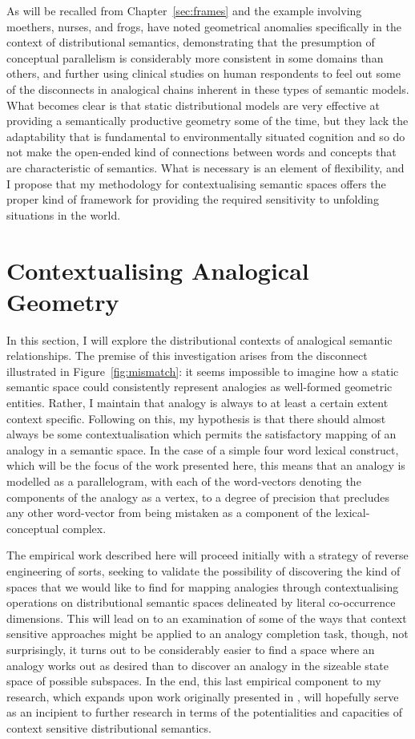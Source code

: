 As will be recalled from Chapter~\ref{sec:frames} and the example involving moethers, nurses, and frogs, \cite{ChenEA2017} have noted geometrical anomalies specifically in the context of distributional semantics, demonstrating that the presumption of conceptual parallelism is considerably more consistent in some domains than others, and further using clinical studies on human respondents to feel out some of the disconnects in analogical chains inherent in these types of semantic models.  What becomes clear is that static distributional models are very effective at providing a semantically productive geometry some of the time, but they lack the adaptability that is fundamental to environmentally situated cognition and so do not make the open-ended kind of connections between words and concepts that are characteristic of semantics.  What is necessary is an element of flexibility, and I propose that my methodology for contextualising semantic spaces offers the proper kind of framework for providing the required sensitivity to unfolding situations in the world.

\section{Contextualising Analogical Geometry} \label{sec:anatext}
In this section, I will explore the distributional contexts of analogical semantic relationships.  The premise of this investigation arises from the disconnect illustrated in Figure~\ref{fig:mismatch}: it seems impossible to imagine how a static semantic space could consistently represent analogies as well-formed geometric entities.  Rather, I maintain that analogy is always to at least a certain extent context specific.  Following on this, my hypothesis is that there should almost always be some contextualisation which permits the satisfactory mapping of an analogy in a semantic space.  In the case of a simple four word lexical construct, which will be the focus of the work presented here, this means that an analogy is modelled as a parallelogram, with each of the word-vectors denoting the components of the analogy as a vertex, to a degree of precision that precludes any other word-vector from being mistaken as a component of the lexical-conceptual complex.

The empirical work described here will proceed initially with a strategy of reverse engineering of sorts, seeking to validate the possibility of discovering the kind of spaces that we would like to find for mapping analogies through contextualising operations on distributional semantic spaces delineated by literal co-occurrence dimensions.  This will lead on to an examination of some of the ways that context sensitive approaches might be applied to an analogy completion task, though, not surprisingly, it turns out to be considerably easier to find a space where an analogy works out as desired than to discover an analogy in the sizeable state space of possible subspaces.  In the end, this last empirical component to my research, which expands upon work originally presented in \cite{McGregorEA2016}, will hopefully serve as an incipient to further research in terms of the potentialities and capacities of context sensitive distributional semantics.


